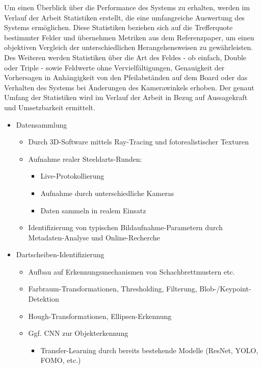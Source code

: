 Um einen Überblick über die Performance des Systems zu erhalten, werden im Verlauf der Arbeit Statistiken erstellt, die eine umfangreiche Auswertung des Systems ermöglichen. Diese Statistiken beziehen sich auf die Trefferquote bestimmter Felder und übernehmen Metriken aus dem Referenzpaper, um einen objektiven Vergleich der unterschiedlichen Herangehensweisen zu gewährleisten. Des Weiteren werden Statistiken über die Art des Feldes - ob einfach, Double oder Triple - sowie Feldwerte ohne Vervielfältigungen, Genauigkeit der Vorhersagen in Anhängigkeit von den Pfeilabständen auf dem Board oder das Verhalten des Systems bei Änderungen des Kamerawinkels erhoben. Der genaut Umfang der Statistiken wird im Verlauf der Arbeit in Bezug auf Aussagekraft und Umsetzbarkeit ermittelt.

\iffalse
\begin{itemize}
    \item Datensammlung
    \begin{itemize}
        \raggedright
        \item Durch 3D-Software mittels Ray-Tracing und fotorealistischer Texturen
        \item Aufnahme realer Steeldarts-Runden:
        \begin{itemize}
            \item Live-Protokollierung
            \item Aufnahme durch unterschiedliche Kameras
            \item Daten sammeln in realem Einsatz
        \end{itemize}
        \item Identifizierung von typischen Bildaufnahme-Parametern durch Metadaten-Analyse und Online-Recherche
    \end{itemize}

    \item Dartscheiben-Identifizierung
    \begin{itemize}
        \raggedright
        \item Aufbau auf Erkennungsmechanismen von Schachbrettmustern etc.
        \item Farbraum-Transformationen, Thresholding, Filterung, Blob-/Keypoint-Detektion
        \item Hough-Transformationen, Ellipsen-Erkennung
        \item Ggf. CNN zur Objekterkennung
        \begin{itemize}
            \item Transfer-Learning durch bereits bestehende Modelle (ResNet, YOLO, FOMO, etc.)
        \end{itemize}
    \end{itemize}


\end{itemize}
